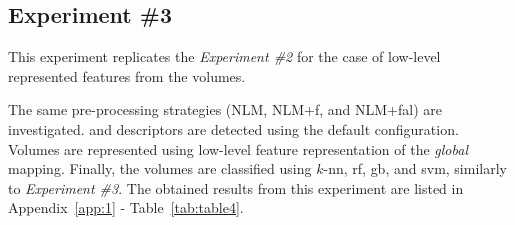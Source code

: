 \subsection{Experiment \#3}\label{subsec:exp3}
%
%
%
%

This experiment replicates the \emph{Experiment \#2} for the case of low-level represented features from the volumes.

The same pre-processing strategies (NLM, NLM+\acs{f}, and NLM+\acs{fal}) are investigated.
\lbp and \lbptop descriptors are detected using the default configuration.
Volumes are represented using low-level feature representation of the \emph{global} mapping.
Finally, the volumes are classified using $k$-\ac{nn}, \ac{rf}, \ac{gb}, and \ac{svm}, similarly to \emph{Experiment \#3}.
The obtained results from this experiment are listed in Appendix~\ref{app:1} - Table~\ref{tab:table4}.



